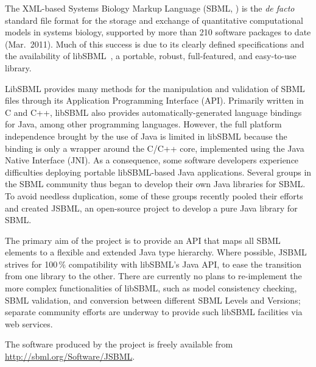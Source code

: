 \documentclass{bioinfo}
\begin{document}
The XML-based Systems Biology Markup Language (SBML, \citealt{M.Hucka03012003})
is the \emph{de facto} standard file format for the storage and exchange of
quantitative computational models in systems biology, supported by more than
210 software packages to date (Mar.~2011).
Much of this success is due to its
clearly defined specifications and the availability of libSBML~\citep{Bornstein2008},
a portable, robust, full-featured, and easy-to-use library.

LibSBML provides many methods for the manipulation and validation of
SBML files through its Application Programming Interface (API).
Primarily written in C and C++, libSBML also provides automatically-generated
language bindings for Java\texttrademark, among other programming languages.
However, the full platform independence brought by the use of Java is limited in
libSBML because the binding is only a wrapper
around the C/C++ core, implemented using the Java Native Interface (JNI).
As a consequence, some software developers experience difficulties
deploying portable libSBML-based Java applications.
Several groups in the SBML community thus began to
develop their own Java libraries for SBML. To avoid needless duplication, some of
these groups recently pooled their efforts and created JSBML, an
open-source project to develop a pure Java library for SBML.

The primary aim of the project is to provide an API 
that maps all SBML elements to a flexible and extended
Java type hierarchy. Where possible, JSBML strives for
100\,\% compatibility with libSBML's Java API, to ease the transition from
one library to the other. There are currently no plans to re-implement 
the more complex functionalities of libSBML, such as model consistency checking,
SBML validation, and conversion between different SBML Levels and Versions;
separate community efforts are underway to provide such libSBML facilities
via web services.

The software produced by the project is freely available from
\href{http://sbml.org/Software/JSBML}{http://sbml.org/Software/JSBML}.


\end{document}
